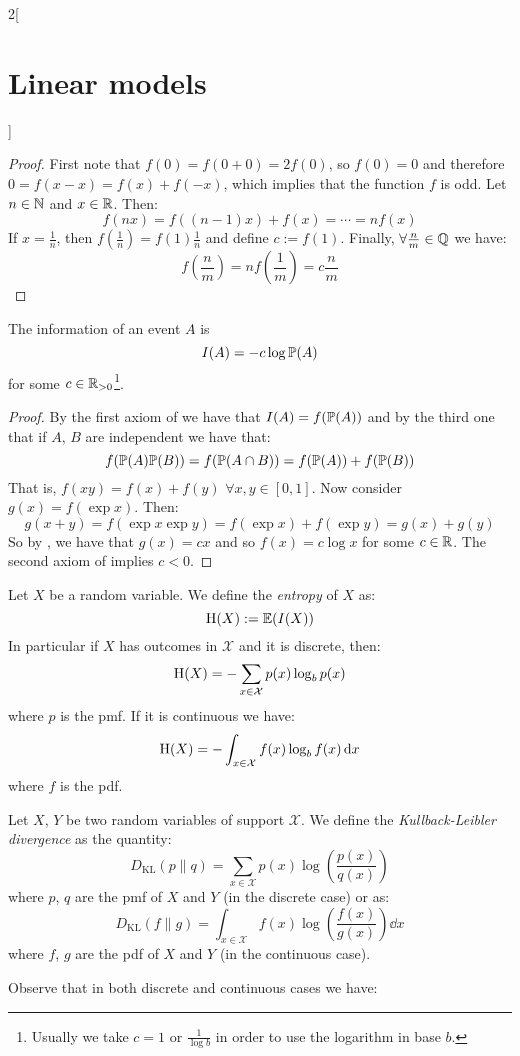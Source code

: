 \documentclass[../../../main_math.tex]{subfiles}
\begin{document}
\begin{multicols}{2}[\section{Linear models}]
\begin{proof}
    First note that $f(0)=f(0+0)=2f(0)$, so $f(0)=0$ and therefore $0=f(x-x)=f(x)+f(-x)$, which implies that the function $f$ is odd.
    Let $n\in\mathbb{N}$ and $x\in\mathbb{R}$. Then:
    $$f(nx)=f((n-1)x) +f(x)=\cdots=nf(x)$$
    If $x= \frac{1}{n}$, then $f(\frac{1}{n})=f(1)\frac{1}{n}$ and define $c:= f(1)$. Finally, $\forall \frac{n}{m}\in\mathbb{Q}$ we have: $$f\left(\frac{n}{m}\right)=nf\left(\frac{1}{m}\right)=c\frac{n}{m}$$
  \end{proof}
  \begin{lemma}
    The information of an event $A$ is $$I(A)=-c\log\mathbb{P}(A)$$ for some $c\in\mathbb{R}_{> 0}$\footnote{Usually we take $c=1$ or $\frac{1}{\log b}$ in order to use the logarithm in base $b$.}.
  \end{lemma}
  \begin{proof}
    By the first axiom of  we have that $I(A)=f(\mathbb{P}(A))$ and by the third one that if $A$, $B$ are independent we have that: $$f(\mathbb{P}(A)\mathbb{P}(B))=f(\mathbb{P}(A\cap B))=f(\mathbb{P}(A))+f(\mathbb{P}(B))$$
    That is, $f(xy) = f(x)+f(y)$ $\forall x,y\in[0,1]$. Now consider $g(x)=f(\exp{x})$. Then:
    $$g(x+y)=f(\exp{x}\exp{y})=f(\exp{x})+f(\exp{y})=g(x)+g(y)$$
    So by , we have that $g(x)=cx$ and so $f(x)=c\log x$ for some $c\in\mathbb{R}$. The second axiom of  implies $c<0$.
  \end{proof}
  \begin{definition}[Entropy]
    Let $X$ be a random variable. We define the \emph{entropy} of $X$ as:
    $$\mathrm{H}(X):=\mathbb{E}(I(X))$$
    In particular if $X$ has outcomes in $\mathcal{X}$ and it is discrete, then:
    $$\mathrm{H}(X)=-\sum_{x\in\mathcal{X}}p(x)\log_bp(x)$$
    where $p$ is the pmf. If it is continuous we have:
    $$\mathrm{H}(X)=-\int_{x\in\mathcal{X}}f(x)\log_bf(x)\dd{x}$$
    where $f$ is the pdf.
  \end{definition}
  \begin{definition}
    Let $X$, $Y$ be two random variables of support $\mathcal{X}$. We define the \emph{Kullback-Leibler divergence} as the quantity:
    $$D_{\mathrm{KL}}(p\parallel q)=\sum_{x\in\mathcal{X}}p(x)\log\left(\frac{p(x)}{q(x)}\right)$$
    where $p$, $q$ are the pmf of $X$ and $Y$ (in the discrete case) or as:
    $$D_{\mathrm{KL}}(f\parallel g)=\int_{x\in\mathcal{X}}f(x)\log\left(\frac{f(x)}{g(x)}\right)\dd{x}$$
    where $f$, $g$ are the pdf of $X$ and $Y$ (in the continuous case).
  \end{definition}
  \begin{remark}
    Observe that in both discrete and continuous cases we have:

\end{remark}
\end{multicols}
\end{document}
